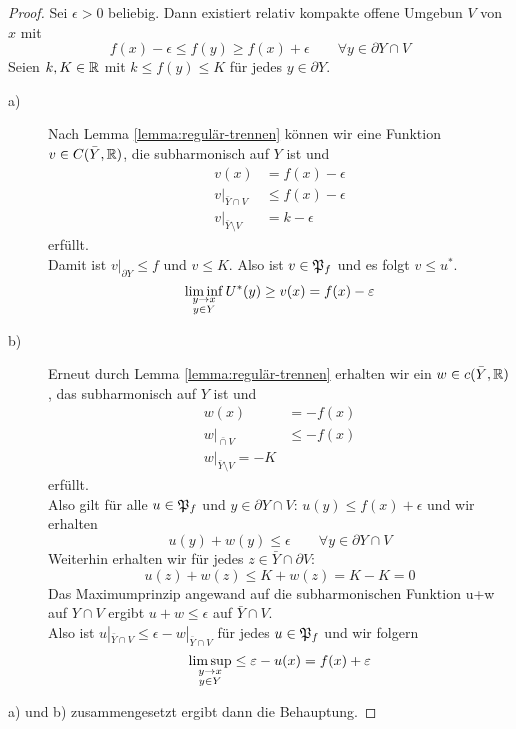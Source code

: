 \begin{proof}
  Sei $\epsilon > 0$ beliebig. Dann existiert relativ kompakte offene
  Umgebun $V$ von $x$ mit
  \[
  f(x) - \epsilon \leq f(y) \geq f(x) + \epsilon \qquad \forall y
  \in \partial Y \cap V
  \]
  Seien $k, K \in \mathbb{R}$ mit $k \leq f(y) \leq K$ für jedes $y
  \in \partial Y$.
  \begin{description}
  \item[a)] Nach Lemma \ref{lemma:regulär-trennen} können wir eine
    Funktion $v \in C(\bar Y, \mathbb{R})$, die subharmonisch auf $Y$ ist und
    \begin{align*}
      v(x) & = f(x) - \epsilon \\
      v|_{\bar Y \cap V} & \leq f(x) - \epsilon \\
      v|_{\bar Y \setminus V} & = k - \epsilon
    \end{align*}
    erfüllt.\\
    Damit ist $v|_{\partial Y} \leq f$ und $v \leq K$. Also ist $v \in
    \mathfrak{P}_f$ und es folgt $v \leq u^\ast$.
    \[
    \liminf_{\substack{y \rightarrow x\\y \in Y}} U^\ast(y) \geq v(x) = f(x) - \varepsilon
    \]
  \item[b)] Erneut durch Lemma \ref{lemma:regulär-trennen} erhalten
    wir ein $w \in c(\bar Y, \mathbb{R})$, das subharmonisch auf $Y$ ist und
    \begin{align*}
      w(x) & = - f(x) \\
      w|_{\bar \cap V} & \leq -f(x) \\
      w|_{\bar Y \setminus V}  = -K
    \end{align*}
    erfüllt.\\
    Also gilt für alle $u \in \mathfrak{P}_f$ und $y \in \partial Y \cap V$:
    $u(y) \leq f(x) + \epsilon$ und wir erhalten
    \[
    u(y) + w(y) \leq \epsilon \qquad \forall y \in \partial Y \cap V
    \]
    Weiterhin erhalten wir für jedes $z \in \bar Y \cap \partial V$:
    \[
    u(z) + w(z) \leq K + w(z) = K - K  = 0
    \]
    Das Maximumprinzip angewand auf die subharmonischen Funktion u+w
    auf $Y \cap V$ ergibt $u + w \leq \epsilon $ auf $\bar Y \cap
    V$.\\
    Also ist $u|_{\bar Y \cap V} \leq \epsilon - w|_{\bar Y \cap V}$
    für jedes $u \in \mathfrak{P}_f$ und wir folgern
    \[
    \limsup_{\substack{y \rightarrow x\\y \in Y}} \leq \varepsilon - u(x) = f(x)
    + \varepsilon
    \]
  \end{description}
  a) und b) zusammengesetzt ergibt dann die Behauptung.
\end{proof}

